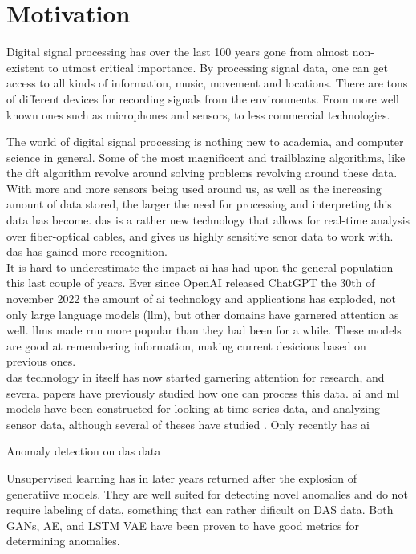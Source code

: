\section{Motivation}

Digital signal processing has over the last 100 years gone from almost non-existent to utmost critical importance. By processing signal data, one can get access to all kinds of information, music, movement and locations. There are tons of different devices for recording signals from the environments. From more well known ones such as microphones and sensors, to less commercial technologies.

The world of digital signal processing is nothing new to academia, and computer science in general. Some of the most magnificent and trailblazing algorithms, like the \acrfull{dft} algorithm revolve around solving problems revolving around these data. With more and more sensors being used around us, as well as the increasing amount of data stored, the larger the need for processing and interpreting this data has become. 
\acrfull{das} is a rather new technology that allows for real-time analysis over fiber-optical cables, and gives us highly sensitive senor data to work with. \acrshort{das} has gained more recognition. \\

It is hard to underestimate the impact \acrshort{ai} has had upon the general population this last couple of years. Ever since OpenAI released ChatGPT the 30th of november 2022 \cite{chatgpt} the amount of \acrshort{ai} technology and applications has exploded, not only large language models (\acrshort{llm}), but other domains have garnered attention as well. \acrshort{llm}s made \acrfull{rnn} more popular than they had been for a while. These models are good at remembering information, making current desicions based on previous ones. \\ 

\acrshort{das} technology in itself has now started garnering attention for research, and several papers have previously studied  how one can process this data. \acrshort{ai} and \acrshort{ml} models have been constructed for looking at time series data, and analyzing sensor data, although several of theses have studied .  Only recently has \acrshort{ai}

Anomaly detection on \acrshort{das} data 

Unsupervised learning has in later years returned after the explosion of generatiive models. They are well suited for detecting novel anomalies \cite{wei2022lstmautoencoder} \cite{srivastava2016unsupervised} and do not require labeling of data, something that can rather dificult on DAS data. Both GANs, AE, and LSTM VAE have been proven to have good metrics for determining anomalies. 


